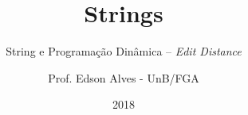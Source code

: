 \title{Strings}
\subtitle{String e Programação Dinâmica -- {\it Edit Distance}}
\author{Prof. Edson Alves - UnB/FGA}
\date{2018}
